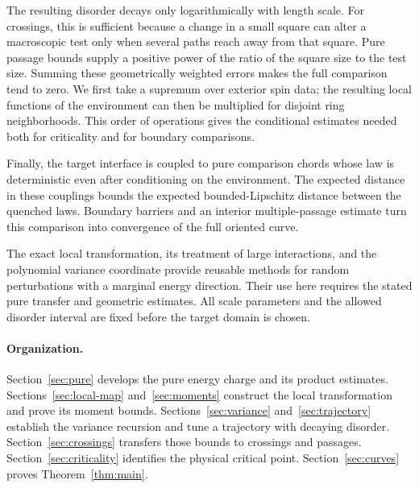 The resulting disorder decays only logarithmically with length scale.
For crossings, this is sufficient because a change in a small square
can alter a macroscopic test only when several paths reach away from
that square. Pure passage bounds supply a positive power of the ratio
of the square size to the test size. Summing these geometrically
weighted errors makes the full comparison tend to zero. We first
take a supremum over exterior spin data; the resulting local functions
of the environment can then be multiplied for disjoint ring
neighborhoods. This order of operations gives the conditional estimates
needed both for criticality and for boundary comparisons.

Finally, the target interface is coupled to pure comparison chords whose
law is deterministic even after conditioning on the environment. The
expected distance in these couplings bounds the expected
bounded-Lipschitz distance between the quenched laws. Boundary barriers
and an interior multiple-passage estimate turn this comparison into
convergence of the full oriented curve.

The exact local transformation, its treatment of large interactions,
and the polynomial variance coordinate provide reusable methods for
random perturbations with a marginal energy direction. Their use here
requires the stated pure transfer and geometric estimates. All scale
parameters and the allowed disorder interval are fixed before the
target domain is chosen.

\paragraph{Organization.}
Section~\ref{sec:pure} develops the pure energy charge and its product
estimates. Sections~\ref{sec:local-map} and~\ref{sec:moments} construct
the local transformation and prove its moment bounds.
Sections~\ref{sec:variance} and~\ref{sec:trajectory} establish the
variance recursion and tune a trajectory with decaying disorder.
Section~\ref{sec:crossings} transfers those bounds to crossings and
passages. Section~\ref{sec:criticality} identifies the physical critical
point. Section~\ref{sec:curves} proves Theorem~\ref{thm:main}.
